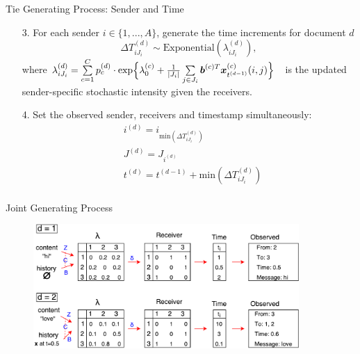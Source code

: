 \documentclass[10pt]{beamer}
\theoremstyle{definition}
\theoremstyle{remark}
\begin{document}
\begin{frame}{Tie Generating Process: Sender and Time}
\begin{itemize}
		\item [3.] For each sender $i \in \{1,...,A\}$, generate the time increments for document $d$
		\begin{equation*}
		\Delta T^{(d)}_{i{J_i}} \sim \mbox{Exponential}(\lambda_{i{J_i}}^{(d)}),
		\end{equation*}\normalsize
		where \footnotesize$\lambda^{(d)}_{iJ_i}= \sum\limits_{c=1}^{C} p^{(d)}_c\cdot\mbox{exp}\Big\{\lambda^{(c)}_0+\textcolor{black}{\frac{1}{|J_i|}\sum\limits_{j \in J_i} \boldsymbol{b}^{(c)T}\boldsymbol{x}^{(c)}_{t^{(d-1)}}(i, j)}\Big\}\quad$\normalsize is the updated sender-specific stochastic intensity given the receivers.\vspace{0.4cm}
		\item[4.] Set the observed sender, receivers and timestamp simultaneously:
			\begin{equation*}
		\begin{aligned}
		&i^{(d)} = i_{\mbox{min}(\Delta T^{(d)}_{i{J_i}})} \\
		&J^{(d)} = J_{i^{(d)}}\\
		&t^{(d)} = t^{(d-1)}+\mbox{min}(\Delta T^{(d)}_{i{J_i}})\\
		\end{aligned}
		\end{equation*}
		\normalsize
\end{itemize}
\end{frame}

\begin{frame}{Joint Generating Process}

	\begin{figure}
		\includegraphics[width=0.9\textwidth]{figures/summary.pdf}
	\end{figure}	\vspace{0.1cm}

\end{frame}
\end{document}
